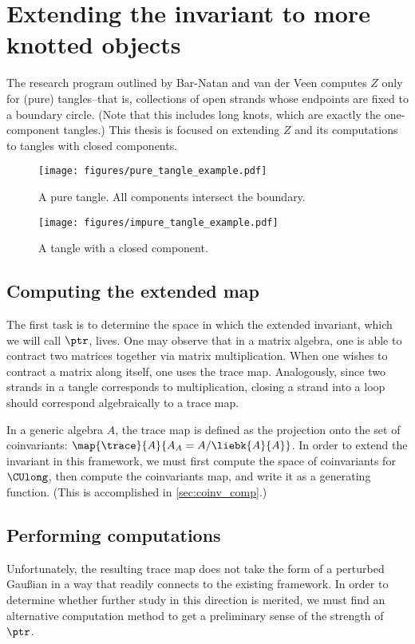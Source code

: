 \section{Extending the invariant to more knotted objects}
The research program outlined by Bar-Natan and van der Veen computes $Z$
only for (pure) tangles--that is, collections of open strands whose endpoints
are fixed to a boundary circle. (Note that this includes long knots, which are
exactly the one-component tangles.) This thesis is focused on extending $Z$ and
its computations to tangles with closed components.
\begin{figure}[h]
        \centering
        \texttt{[image: figures/pure\_tangle\_example.pdf]}
        \caption{A pure tangle. All components intersect the boundary.}
        \label{fig:pure_tangle}
\end{figure}
\begin{figure}[h]
        \centering
        \texttt{[image: figures/impure\_tangle\_example.pdf]}
        \caption{A tangle with a closed component.}
        \label{fig:impure_tangle}
\end{figure}        

\subsection{Computing the extended map}
The first task is to determine the space in which the extended invariant, which
we will call $\ptr$, lives. One may observe that in a matrix algebra, one is
able to contract two matrices together via matrix multiplication. When one
wishes to contract a matrix along itself, one uses the trace map. Analogously,
since two strands in a tangle corresponds to multiplication, closing a strand
into a loop should correspond algebraically to a trace map.

In a generic algebra $A$, the trace map is defined as the projection onto the
set of coinvariants: $\map {\trace} {A} {A_A = A/\liebk{A}{A}}$. In order to
extend the invariant in this framework, we must first compute the space of
coinvariants for $\CUlong$, then compute the coinvariants map, and write it as a
generating function. (This is accomplished in \cref{sec:coinv_comp}.)

\subsection{Performing computations}
Unfortunately, the resulting trace map does not take the form of a perturbed
Gaußian in a way that readily connects to the existing framework. In order to
determine whether further study in this direction is merited, we must find an
alternative computation method to get a preliminary sense of the strength of
$\ptr$.

